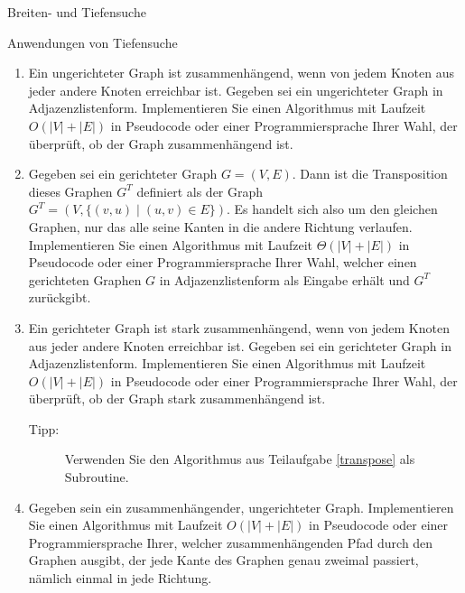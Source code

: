 \documentclass[11pt,a4paper]{article}
\begin{document}
\begin{aufgabe}{2}{Breiten- und Tiefensuche}
\begin{enumerate}
\begin{figure}[h!]
        \end{figure}
    \end{enumerate}
\end{aufgabe}

\begin{aufgabe}{3}{Anwendungen von Tiefensuche}
    \begin{enumerate}[label=\alph*)]
        \item Ein ungerichteter Graph ist zusammenhängend, wenn von jedem Knoten aus jeder andere Knoten erreichbar ist.
        Gegeben sei ein ungerichteter Graph in Adjazenzlistenform.
        Implementieren Sie einen Algorithmus mit Laufzeit $O(|V| + |E|)$ in Pseudocode oder einer Programmiersprache Ihrer Wahl, der überprüft, ob der Graph zusammenhängend ist.
        \item \label{transpose} Gegeben sei ein gerichteter Graph $G = (V, E)$. Dann ist die Transposition dieses Graphen $G^T$ definiert als der Graph $G^T = (V, \{(v, u) \mid (u, v) \in E\})$.
        Es handelt sich also um den gleichen Graphen, nur das alle seine Kanten in die andere Richtung verlaufen.
        Implementieren Sie einen Algorithmus mit Laufzeit $\Theta(|V| + |E|)$ in Pseudocode oder einer Programmiersprache Ihrer Wahl, welcher einen gerichteten Graphen $G$ in Adjazenzlistenform als Eingabe erhält und $G^T$ zurückgibt.
        \item Ein gerichteter Graph ist stark zusammenhängend, wenn von jedem Knoten aus jeder andere Knoten er\-reichbar ist.
        Gegeben sei ein gerichteter Graph in Adjazenzlistenform.
        Implementieren Sie einen Algorithmus mit Laufzeit $O(|V| + |E|)$ in Pseudocode oder einer Programmiersprache Ihrer Wahl, der überprüft, ob der Graph stark zusammenhängend ist.
        \begin{description}
            \item[Tipp:] Verwenden Sie den Algorithmus aus Teilaufgabe \ref*{transpose} als Subroutine.
        \end{description}
        \item Gegeben sein ein zusammenhängender, ungerichteter Graph.
        Implementieren Sie einen Algorithmus mit Laufzeit $O(|V| + |E|)$ in Pseudocode oder einer Programmiersprache Ihrer, welcher zusammenhängenden Pfad durch den Graphen ausgibt, der jede Kante des Graphen genau zweimal passiert, nämlich einmal in jede Richtung.
    \end{enumerate}
\end{aufgabe}
\end{document}

